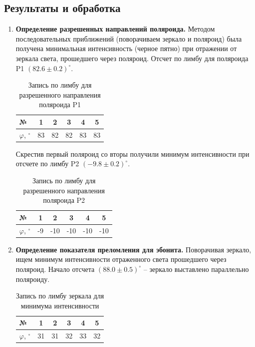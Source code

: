 \documentclass[12pt]{article}
\begin{document}
    \subsection*{Результаты и обработка}
    \begin{enumerate}
        \item \textbf{Определение разрешенных направлений поляроида.}
        Методом последовательных приближений (поворачиваем зеркало и поляроид) была получена минимальная интенсивность
        (черное пятно) при отражении от зеркала света, прошедшего через поляроид.
        Отсчет по лимбу для поляроида P1 $(82.6\pm0.2) ^{\circ}$.
        \begin{table}[h!]
            \centering
            \caption{Запись по лимбу для разрешенного направления поляроида P1}
            \label{tab:1}
            \begin{tabular}{|l|ccccc|}
                \hline
                №                     & 1  & 2  & 3  & 4  & 5  \\\hline
                $\varphi$, $^{\circ}$ & 83 & 82 & 82 & 83 & 83 \\
                \hline
            \end{tabular}
        \end{table}

        Скрестив первый поляроид со вторы получили минимум интенсивности при отсчете по лимбу P2 $(-9.8\pm 0.2)^{\circ}$.
        \begin{table}[h!]
            \centering
            \caption{Запись по лимбу для разрешенного направления поляроида P2}
            \label{tab:2}
            \begin{tabular}{|l|ccccc|}
                \hline
                №                     & 1  & 2   & 3   & 4   & 5   \\\hline
                $\varphi$, $^{\circ}$ & -9 & -10 & -10 & -10 & -10 \\
                \hline
            \end{tabular}
        \end{table}

        \item \textbf{Определение показателя преломления для эбонита.}
        Поворачивая зеркало, ищем минимум интенсивности отраженного света прошедшего через поляроид.
        Начало отсчета $(88.0\pm0.5)^{\circ}$ -- зеркало выставлено параллельно поляроиду.

        \begin{table}[h!]
            \centering
            \caption{Запись по лимбу зеркала для минимума интенсивности}
            \label{tab:3}
            \begin{tabular}{|l|ccccc|}
                \hline
                №                     & 1  & 2  & 3  & 4  & 5  \\\hline
                $\varphi$, $^{\circ}$ & 31 & 31 & 32 & 33 & 32 \\
                \hline
            \end{tabular}
        \end{table}


\end{enumerate}
\end{document}
